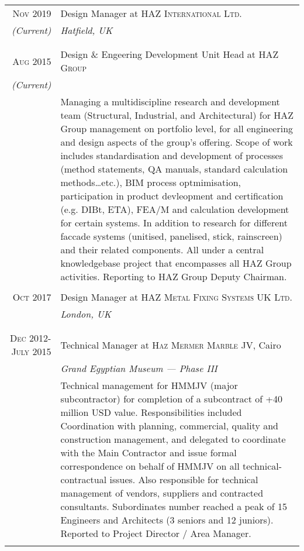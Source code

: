\documentclass[a4paper,11pt]{article} %
\begin{document}
\begin{tabular}{r|p{11cm}}

\textsc{Nov 2019} & Design Manager at \textsc{HAZ International Ltd.}\\
\emph{(Current)} & \emph{Hatfield, UK} \\
& \footnotesize{}\\
\multicolumn{2}{c}{} \\


\textsc{Aug 2015} & Design \& Engeering Development Unit Head at \textsc{HAZ Group}\\
\emph{(Current)} &  \\
& \footnotesize{Managing a multidiscipline research and development team (Structural, Industrial, and Architectural) for HAZ Group management on portfolio level, for all engineering and design aspects of the group's offering. Scope of work includes standardisation and development of processes (method statements, QA manuals, standard calculation methods\ldots etc.), BIM process optmimisation, participation in product devleopment and certification (e.g. DIBt, ETA), FEA/M and calculation development for certain systems. In addition to research for different fac{c}ade systems (unitised, panelised, stick, rainscreen) and their related components. All under a central knowledgebase project that encompasses all HAZ Group activities. Reporting to HAZ Group Deputy Chairman.}\\
\multicolumn{2}{c}{} \\


\textsc{Oct 2017} & Design Manager at \textsc{HAZ Metal Fixing Systems UK Ltd.}\\
& \emph{London, UK} \\
& \footnotesize{}\\
\multicolumn{2}{c}{} \\




\textsc{Dec 2012-July 2015} & Technical Manager at \textsc{Haz Mermer Marble JV}, Cairo\\
& \emph{Grand Egyptian Museum --- Phase III}\\ 
& \footnotesize{Technical management for HMMJV (major subcontractor) for completion of a subcontract of +40 million USD value. Responsibilities included Coordination with planning, commercial, quality and construction management, and delegated to coordinate with the Main Contractor and issue formal correspondence on behalf of HMMJV on all technical-contractual issues. Also responsible for technical management of vendors, suppliers and contracted consultants. Subordinates number reached a peak of 15 Engineers and Architects (3 seniors and 12 juniors). Reported to Project Director / Area Manager.}\\
\multicolumn{2}{c}{} \\


\end{tabular}
\end{document}
